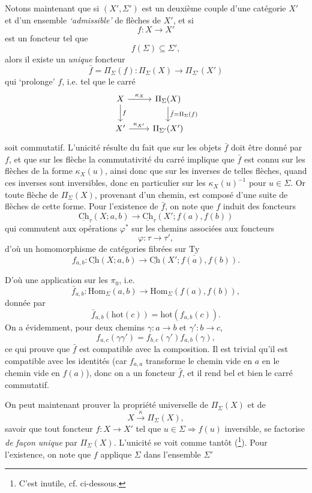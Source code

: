 \documentclass[11pt]{article}
\newcommand{\printedpage}[1]{\marginpar{\footnotesize p.~#1}}
\newcommand{\msp}[1]{\marginpar{\footnotesize [#1]}}
\newcommand{\uTy}{\underline{\mathrm{Ty}}}
\newcommand{\Ch}{\underline{\mathrm{Ch}}}
\newcommand{\Hom}{\mathrm{Hom}}
\newcommand{\hot}{\mathrm{hot}}
\begin{document}
Notons maintenant que si $(X', \Sigma')$ est un deuxième couple d'une catégorie $X'$ et d'un ensemble \textit{`admissible'} de flèches de $X'$, et si
\[
f : X \longrightarrow X'
\]
est un foncteur tel que
\[
f(\Sigma) \subseteq \Sigma',
\]
alors il existe un \textit{unique} foncteur
\[
\bar{f} = \Pi_\Sigma(f) : \Pi_\Sigma(X) \longrightarrow \Pi_{\Sigma'}(X')
\]
qui `prolonge' $f$, i.e. tel que le carré
\printedpage{48}
\msp{page 72}
\[
\begin{tikzcd}
X \arrow[r, "\kappa_X"] \arrow[d, "{\scriptstyle f}"] & \Pi_\Sigma(X) \arrow[d, "{\scriptstyle \bar{f} = \Pi_\Sigma(f)}"] \\
X' \arrow[r, "\kappa_{X'}"] & \Pi_{\Sigma'}(X')
\end{tikzcd}
\]
soit commutatif. L'unicité résulte du fait que sur les objets $\bar{f}$ doit être donné par $f$, et que sur les flèche la commutativité du carré implique que $\bar{f}$ est connu sur les flèches de la forme $\kappa_X(u)$, ainsi donc que sur les inverses de telles flèches, quand ces inverses sont inversibles, donc en particulier sur les $\kappa_X(u)^{-1}$ pour $u \in \Sigma$. Or toute flèche de $\Pi_\Sigma(X)$, provenant d'un chemin, est composé d'une suite de flèches de cette forme. Pour l'existence de $\bar{f}$, on note que $f$ induit des foncteurs %
\[
\Ch_\tau(X; a, b) \longrightarrow \Ch_\tau(X'; f(a), f(b))
\]
qui commutent aux opérations $\varphi^*$ sur les chemins associées aux foncteurs
\[
\varphi : \tau \longrightarrow \tau',
\]
d'où un homomorphisme de catégories fibrées sur $\uTy$
\[
f_{a,b} : \Ch(X; a, b) \longrightarrow \Ch(X'; f(a), f(b)).
\]

\msp{page 73}

D'où une application sur les $\pi_0$, i.e.
\[
\bar{f}_{a,b} : \Hom_\Sigma(a,b) \longrightarrow \Hom_\Sigma(f(a), f(b)),
\]
donnée par
\[
\bar{f}_{a,b}(\hot(c)) = \hot(f_{a,b}(c)).
\]
On a évidemment, pour deux chemins $\gamma : a \longrightarrow b$ et $\gamma' : b \longrightarrow c$,
\[
f_{a,c}(\gamma\gamma') = f_{b,c}(\gamma')f_{a,b}(\gamma),
\]
ce qui prouve que $\bar{f}$ est compatible avec la composition. Il est trivial qu'il est compatible avec les identités (car $f_{a,a}$ transforme le chemin vide en $a$ en le chemin vide en $f(a)$), donc on a un foncteur $\bar{f}$, et il rend bel et bien le carré commutatif.

On peut maintenant prouver la propriété universelle de $\Pi_\Sigma(X)$ et de
\[
X \xrightarrow{\ \kappa\ } \Pi_\Sigma(X),
\]
savoir que tout foncteur $f : X \longrightarrow X'$ tel que $u \in \Sigma \Longrightarrow f(u)$ inversible, se factorise \textit{de façon unique} par $\Pi_\Sigma(X)$. L'unicité se voit comme tantôt (\footnote[20]{C'est inutile, cf. ci-dessous.}). Pour l'existence, on note que $f$ applique $\Sigma$ dans l'ensemble $\Sigma'$
\end{document}
